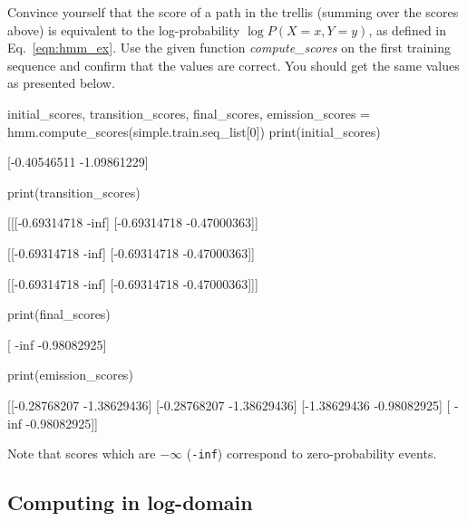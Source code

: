 \begin{exercise}
Convince yourself that the score of a path in the trellis 
(summing over the scores above) is equivalent 
to the log-probability $\log P(X=x,Y=y)$, 
as defined in 
Eq.~\ref{eqn:hmm_ex}. 
Use the given function \emph{compute\_scores} on the first training sequence and confirm that the values are correct. You should get the same values as presented below.


%

\begin{python}
initial_scores, transition_scores, final_scores, emission_scores = hmm.compute_scores(simple.train.seq_list[0])
print(initial_scores)

[-0.40546511 -1.09861229]

print(transition_scores)

[[[-0.69314718        -inf]
  [-0.69314718 -0.47000363]]

 [[-0.69314718        -inf]
  [-0.69314718 -0.47000363]]

 [[-0.69314718        -inf]
  [-0.69314718 -0.47000363]]]

print(final_scores)

[       -inf -0.98082925]

print(emission_scores)

[[-0.28768207 -1.38629436]
 [-0.28768207 -1.38629436]
 [-1.38629436 -0.98082925]
 [       -inf -0.98082925]] 
\end{python}

Note that scores which are $-\infty$ (\texttt{-inf}) correspond
to zero-probability events. 
\end{exercise}

\subsection{Computing in log-domain}\label{sec:logdomain}

